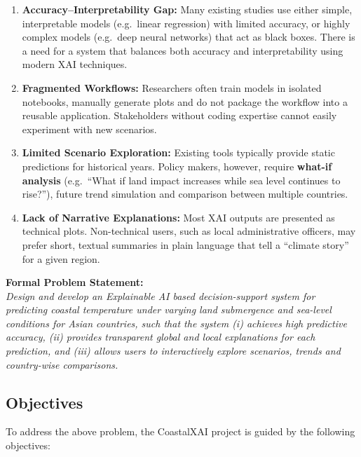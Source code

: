 \documentclass[12pt, a4paper]{article}
\begin{document}
\begin{enumerate}[label=\alph*)]
  \item \textbf{Accuracy–Interpretability Gap:} Many existing studies use
  either simple, interpretable models (e.g.\ linear regression) with
  limited accuracy, or highly complex models (e.g.\ deep neural
  networks) that act as black boxes. There is a need for a system
  that balances both accuracy and interpretability using modern XAI
  techniques.
  \item \textbf{Fragmented Workflows:} Researchers often train models in
  isolated notebooks, manually generate plots and do not package the
  workflow into a reusable application. Stakeholders without coding
  expertise cannot easily experiment with new scenarios.
  \item \textbf{Limited Scenario Exploration:} Existing tools typically
  provide static predictions for historical years. Policy makers,
  however, require \textbf{what-if analysis} (e.g.\ ``What if land impact
  increases while sea level continues to rise?''), future trend
  simulation and comparison between multiple countries.
  \item \textbf{Lack of Narrative Explanations:} Most XAI outputs are
  presented as technical plots. Non-technical users, such as local
  administrative officers, may prefer short, textual summaries in
  plain language that tell a ``climate story'' for a given region.
\end{enumerate}

\noindent
\textbf{Formal Problem Statement:}\\[0.1cm]
\textit{Design and develop an Explainable AI based decision-support system
for predicting coastal temperature under varying land submergence and
sea-level conditions for Asian countries, such that the system (i)
achieves high predictive accuracy, (ii) provides transparent global and
local explanations for each prediction, and (iii) allows users to
interactively explore scenarios, trends and country-wise comparisons.}

\subsection{\textbf{Objectives}}

To address the above problem, the CoastalXAI project is guided by the
following objectives:
\end{document}
